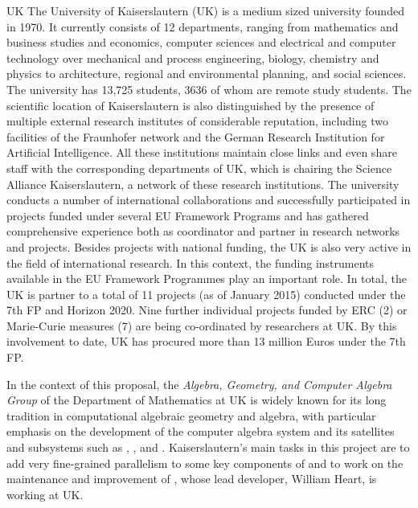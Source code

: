 \begin{sitedescription}{UK}
The University of Kaiserslautern (UK) is a medium sized university founded in 1970. It currently 
consists of 12 departments, ranging from mathematics and business studies and economics, 
computer sciences and electrical and computer technology over mechanical and process engineering, 
biology, chemistry and physics to architecture, regional and environmental planning, and social sciences. 
The university has 13,725 students, 3636 of whom are remote study students. The scientific location 
of Kaiserslautern is also distinguished by the presence of multiple external research institutes of 
considerable reputation, including two facilities of the Fraunhofer network and the German Research 
Institution for Artificial Intelligence. All these institutions maintain close links and even share staff 
with the corresponding departments of UK, which is chairing the Science Alliance Kaiserslautern, 
a network of these research institutions. The university conducts a number of international 
collaborations and successfully participated in projects funded under several EU Framework 
Programs and has gathered comprehensive experience both as coordinator and partner in research 
networks and projects. Besides projects with national funding, the UK is 
also very active in the field of international research. In this context, the funding instruments 
available in the EU Framework Programmes play an important role. In total, the UK is partner 
to a total of 11 projects (as of January 2015) conducted under the 7th FP and Horizon 2020. 
Nine further individual projects funded by ERC (2) or Marie-Curie measures (7) are being co-ordinated 
by researchers at UK. By this involvement to date, UK has procured more than 13 million Euros under the 7th FP.

\medskip In the context of this proposal, the
\emph{Algebra, Geometry, and Computer Algebra Group}  of the Department
of Mathematics at UK is widely known for its long tradition in 
computational algebraic geometry and algebra, with particular emphasis on the 
development of the computer algebra system \Singular and its satellites and  
subsystems such as , , and .
Kaiserslautern's main tasks in this project are to add very fine-grained 
parallelism to some key components of \Singular and to work
on the maintenance and improvement of \MPIR, whose lead developer,
William Heart, is working at UK.


\end{sitedescription}
